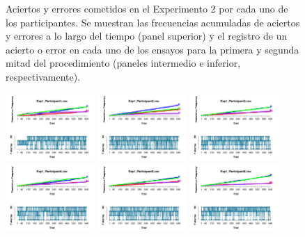 \begin{figure}[th]
\caption[Aciertos y Errores a lo largo del tiempo; Experimento 2]{Aciertos y errores cometidos en el Experimento 2 por cada uno de los participantes. Se muestran las frecuencias acumuladas de aciertos y errores a lo largo del tiempo (panel superior) y el registro de un acierto o error en cada uno de los ensayos para la primera y segunda mitad del procedimiento (paneles intermedio e inferior, respectivamente).}
\label{fig:Success_E2}
\end{figure}

\begin{figure}[th]
\centering
\includegraphics[width=0.30\textwidth]{Figures/Outcome_Exp1_P1} \includegraphics[width=0.30\textwidth]{Figures/Outcome_Exp1_P2} \includegraphics[width=0.30\textwidth]{Figures/Outcome_Exp1_P3}
\includegraphics[width=0.30\textwidth]{Figures/Outcome_Exp1_P4} \includegraphics[width=0.30\textwidth]{Figures/Outcome_Exp1_P5} \includegraphics[width=0.30\textwidth]{Figures/Outcome_Exp1_P6}

\end{figure}
